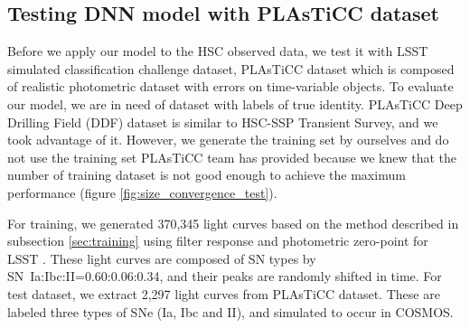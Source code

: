 \documentclass[useamsfonts]{pasj01}
\begin{document}
\subsection{Testing DNN model with PLAsTiCC dataset} 
\label{sec:p}
%
Before we apply our model to the HSC observed data, we test it with LSST simulated classification challenge dataset, PLAsTiCC dataset \citep{allam18a,malz19a} which is composed of realistic photometric dataset with errors on time-variable objects.
To evaluate our model, we are in need of dataset with labels of true identity. 
PLAsTiCC Deep Drilling Field (DDF) dataset is similar to HSC-SSP Transient Survey, and we took advantage of it.
However, %
we generate the training set by ourselves 
and do not use the training set PLAsTiCC team has provided because we knew that the number of training dataset is not good enough to achieve the maximum performance (figure \ref{fig:size_convergence_test}).

For training, we generated 370,345 light curves based on the method described in subsection \ref{sec:training} using filter response and photometric zero-point for LSST \citep{ivezic19a}.
These light curves are composed of SN types by SN~Ia:Ibc:II=0.60:0.06:0.34, and their peaks are randomly shifted in time.
%
For test dataset, we extract 2,297 light curves from PLAsTiCC dataset.
These are labeled three types of SNe (Ia, Ibc and II), and simulated to occur in COSMOS.
\end{document}

